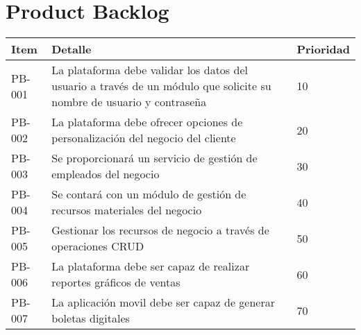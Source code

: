 \chapter{Product Backlog}

\begin{table}[htbp]
	\begin{center}
		\begin{tabular}{|p{1.5cm} | p{12cm} | p{2cm} |}
			\hline
			Item & Detalle & Prioridad \\
			\hline
			PB-001 & La plataforma debe validar los datos del usuario a través de un módulo que solicite su nombre de usuario y contraseña & 10 \\
			\hline
			PB-002 & La plataforma debe ofrecer opciones de personalización del negocio del cliente & 20  \\
			\hline
			PB-003 & Se proporcionará un servicio de gestión de empleados del negocio & 30  \\
			\hline
			PB-004 & Se contará con un módulo de gestión de recursos materiales del negocio & 40 \\
			\hline
			PB-005 & Gestionar los recursos de negocio a través de operaciones CRUD & 50 \\
			\hline	
			PB-006 & La plataforma debe ser capaz de realizar reportes gráficos de ventas & 60 \\
			\hline
			PB-007 & La aplicación movil debe ser capaz de generar boletas digitales & 70 \\
			\hline
		\end{tabular}
	\end{center}
\end{table}

